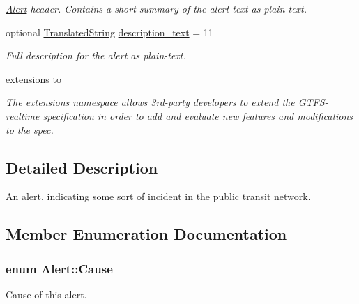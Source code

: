\begin{DoxyCompactItemize}
\begin{DoxyCompactList}\small\item\em \hyperlink{structAlert}{Alert} header. Contains a short summary of the alert text as plain-\/text. \end{DoxyCompactList}\item 
optional \hyperlink{structTranslatedString}{Translated\+String} \hyperlink{structAlert_ac75dc73c0e4fe3c3f8e1116e931ecde6}{description\+\_\+text} = 11
\begin{DoxyCompactList}\small\item\em Full description for the alert as plain-\/text. \end{DoxyCompactList}\item 
extensions \hyperlink{structAlert_ad23cbc49bf56755a6c2c9974a644bc72}{to}
\begin{DoxyCompactList}\small\item\em The extensions namespace allows 3rd-\/party developers to extend the G\+T\+F\+S-\/realtime specification in order to add and evaluate new features and modifications to the spec. \end{DoxyCompactList}\end{DoxyCompactItemize}


\subsection{Detailed Description}
An alert, indicating some sort of incident in the public transit network. 

\subsection{Member Enumeration Documentation}
\subsubsection[{\texorpdfstring{Cause}{Cause}}]{\setlength{\rightskip}{0pt plus 5cm}enum {\bf Alert\+::\+Cause}}\hypertarget{structAlert_a199c4ca00d947ef89a8523c495ad2d2f}{}\label{structAlert_a199c4ca00d947ef89a8523c495ad2d2f}


Cause of this alert. 

